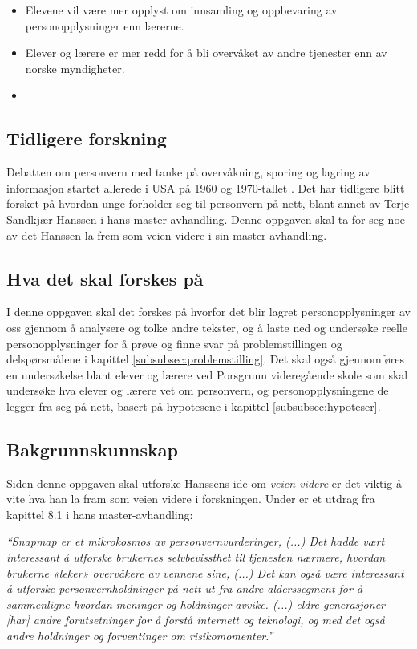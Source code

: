 \begin{itemize}
    \item Elevene vil være mer opplyst om innsamling og oppbevaring av personopplysninger enn lærerne.
    \item Elever og lærere er mer redd for å bli overvåket av andre tjenester enn av norske myndigheter.
    \item 
\end{itemize}

\subsection{Tidligere forskning}
Debatten om personvern med tanke på overvåkning, sporing og lagring av informasjon startet allerede i USA på 1960 og 1970-tallet \parencite[36]{bok:nissenbaum}. Det har tidligere blitt forsket på hvordan unge forholder seg til personvern på nett, blant annet av Terje Sandkjær Hanssen i hans master-avhandling. Denne oppgaven skal ta for seg noe av det Hanssen la frem som veien videre i sin master-avhandling. \parencite{master:hanssen}

\subsection{Hva det skal forskes på}
I denne oppgaven skal det forskes på hvorfor det blir lagret personopplysninger av oss gjennom å analysere og tolke andre tekster, og å laste ned og undersøke reelle personopplysninger for å prøve og finne svar på problemstillingen og delspørsmålene i kapittel \ref{subsubsec:problemstilling}. Det skal også gjennomføres en undersøkelse blant elever og lærere ved Porsgrunn videregående skole som skal undersøke hva elever og lærere vet om personvern, og personopplysningene de legger fra seg på nett, basert på hypotesene i kapittel \ref{subsubsec:hypoteser}.

\subsection{Bakgrunnskunnskap}
Siden denne oppgaven skal utforske Hanssens ide om \textit{veien videre} er det viktig å vite hva han la fram som veien videre i forskningen. Under er et utdrag fra kapittel 8.1 i hans master-avhandling:

\textit{``Snapmap er et mikrokosmos av personvernvurderinger, (...) Det hadde vært interessant å utforske brukernes selvbevissthet til tjenesten nærmere, hvordan brukerne «leker» overvåkere av vennene sine, (...) Det kan også være interessant å utforske personvernholdninger på nett ut fra andre alderssegment for å sammenligne hvordan meninger og holdninger avvike. (...) eldre generasjoner [har] andre forutsetninger for å forstå internett og teknologi, og med det også andre holdninger og forventinger om risikomomenter.''} \parencite[69]{master:hanssen}

\newpage